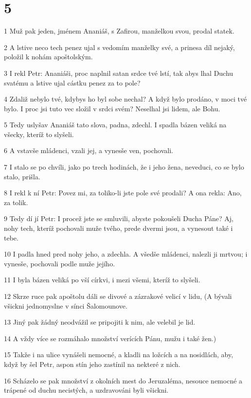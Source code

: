\chapter{5}

\par 1 Muž pak jeden, jménem Ananiáš, s Zafirou, manželkou svou, prodal statek.
\par 2 A lstive neco tech penez ujal s vedomím manželky své, a prinesa díl nejaký, položil k nohám apoštolským.
\par 3 I rekl Petr: Ananiáši, proc naplnil satan srdce tvé lstí, tak abys lhal Duchu svatému a lstive ujal cástku penez za to pole?
\par 4 Zdaliž nebylo tvé, kdybys ho byl sobe nechal? A když bylo prodáno, v moci tvé bylo. I proc jsi tuto vec složil v srdci svém? Neselhal jsi lidem, ale Bohu.
\par 5 Tedy uslyšav Ananiáš tato slova, padna, zdechl. I spadla bázen veliká na všecky, kteríž to slyšeli.
\par 6 A vstavše mládenci, vzali jej, a vynesše ven, pochovali.
\par 7 I stalo se po chvíli, jako po trech hodinách, že i jeho žena, neveduci, co se bylo stalo, prišla.
\par 8 I rekl k ní Petr: Povez mi, za toliko-li jste pole své prodali? A ona rekla: Ano, za tolik.
\par 9 Tedy dí jí Petr: I procež jste se smluvili, abyste pokoušeli Ducha Páne? Aj, nohy tech, kteríž pochovali muže tvého, prede dvermi jsou, a vynesout také i tebe.
\par 10 I padla hned pred nohy jeho, a zdechla. A všedše mládenci, nalezli ji mrtvou; i vynesše, pochovali podle muže jejího.
\par 11 I byla bázen veliká po vší církvi, i mezi všemi, kteríž to slyšeli.
\par 12 Skrze ruce pak apoštolu dáli se divové a zázrakové velicí v lidu, (A bývali všickni jednomyslne v sínci Šalomounove.
\par 13 Jiný pak žádný neodvážil se pripojiti k nim, ale velebil je lid.
\par 14 A vždy více se rozmáhalo množství verících Pánu, mužu i také žen.)
\par 15 Takže i na ulice vynášeli nemocné, a kladli na ložcích a na nosidlách, aby, když by šel Petr, aspon stín jeho zastínil na nekteré z nich.
\par 16 Scházelo se pak množství z okolních mest do Jeruzaléma, nesouce nemocné a trápené od duchu necistých, a uzdravováni byli všickni.
